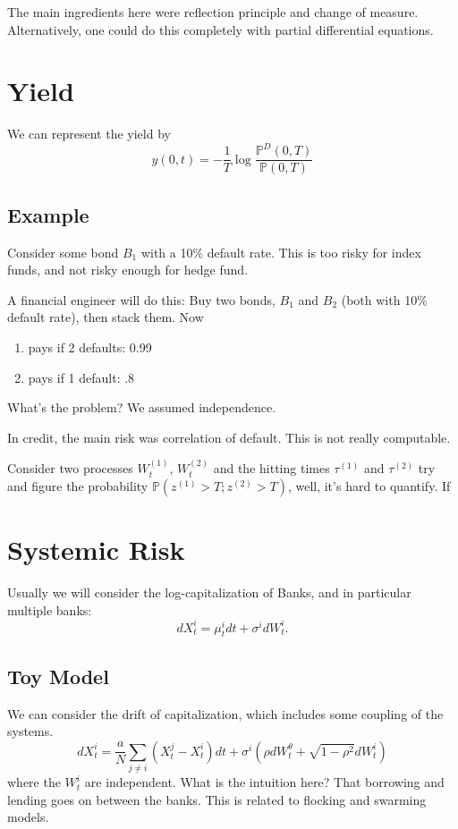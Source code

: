 The main ingredients here were reflection principle and change of measure. Alternatively, one could do this completely with partial differential equations.

\section{Yield}
We can represent the yield by
\begin{equation}
	y(0,t) = -\frac{1}{T}\log \frac{\mathbb{P}^D(0,T)}{\mathbb{P}(0,T)}
\end{equation}

\subsection{Example}
Consider some bond $B_1$ with a 10\% default rate. This is too risky for index funds, and not risky enough for hedge fund.

A financial engineer will do this: Buy two bonds, $B_1$ and $B_2$ (both with 10\% default rate), then stack them. Now
\begin{enumerate}
	\item pays if 2 defaults: 0.99
	\item pays if 1 default: .8
\end{enumerate}
What's the problem? We assumed independence.

In credit, the main risk was correlation of default. This is not really computable.

Consider two processes $W_t^{(1)}$, $W_t^{(2)}$ and the hitting times $\tau^{(1)}$ and $\tau^{(2)}$ try and figure the probability $\mathbb{P}(z^{(1)} > T; z^{(2)}> T)$, well, it's hard to quantify. If 

\section{Systemic Risk}
Usually we will consider the log-capitalization of Banks, and in particular multiple banks:
\begin{equation}
	dX_t^i = \mu_t^i dt + \sigma^i dW_t^i.
\end{equation}
\subsection{Toy Model}
We can consider the drift of capitalization, which includes some coupling of the systems.
\begin{equation}
	dX^i_t = \frac{a}{N} \sum_{j\ne i} (X^j_t - X_t^i)dt + \sigma^i (\rho dW_t^\theta + \sqrt{1-\rho^2} dW_t^i)
\end{equation}
where the $W^i_t$ are independent.
What is the intuition here? That borrowing and lending goes on between the banks. This is related to flocking and swarming models.

